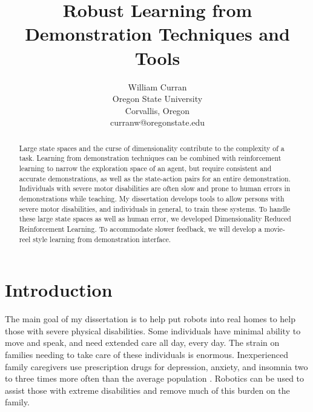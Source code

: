 \documentclass[letterpaper]{article}
\begin{document}

\title{Robust Learning from Demonstration Techniques and Tools}


\author{William Curran \\
Oregon State University \\
Corvallis, Oregon \\
curranw@oregonstate.edu \\
}

\maketitle


\begin{abstract}
Large state spaces and the curse of dimensionality contribute to the complexity of a task. Learning from demonstration techniques can be combined with reinforcement learning to narrow the exploration space of an agent, but require consistent and accurate demonstrations, as well as the state-action pairs for an entire demonstration. Individuals with severe motor disabilities are often slow and prone to human errors in demonstrations while teaching. My dissertation develops tools to allow persons with severe motor disabilities, and individuals in general, to train these systems. To handle these large state spaces as well as human error, we developed Dimensionality Reduced Reinforcement Learning. To accommodate slower feedback, we will develop a movie-reel style learning from demonstration interface. 
\end{abstract}


\section{Introduction}
The main goal of my dissertation is to help put robots into real homes to help those with severe physical disabilities. Some
individuals have minimal ability to move and speak, and need extended care all day, every day. The strain on families needing to take care of these individuals is enormous. Inexperienced family caregivers use prescription drugs for depression, anxiety, and insomnia two to three times more often than the average population \cite{Gallagher01081989}. Robotics can be used to assist those with extreme disabilities and remove much of this burden on the family.
\end{document}
